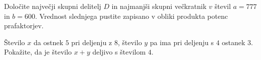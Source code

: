 \documentclass[addpoints]{exam}
\begin{document}
\begin{questions}









    \question[4]
    Določite največji skupni delitelj $D$ in najmanjši skupni večkratnik $v$ števil $a=777$ in $b=600$.
    Vrednost slednjega pustite zapisano v obliki produkta potenc prafaktorjev.

    
    


    \question[3]
    Število $x$ da ostnek $5$ pri deljenju z $8$, število $y$ pa ima pri deljenju s $4$ ostanek $3$. 
    Pokažite, da je število $x+y$ deljivo s številom $4$.

    


        


    
\end{questions}
\end{document}
